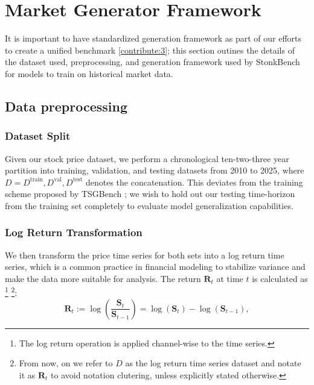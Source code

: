 \section{Market Generator Framework}\label{sec:generator-framework}
It is important to have standardized generation framework as
part of our efforts to create a unified benchmark \ref{contribute:3};
this section outines the details of the dataset used, preprocessing, and
 generation framework used by StonkBench for models to train on 
 historical market data.

\subsection{Data preprocessing}\label{subsec:data-preprocess}
    \subsubsection{Dataset Split}
    Given our stock price dataset, we perform a chronological
    ten-two-three year partition into training, validation, and testing
    datasets from 2010 to 2025, where $D = D^{\mathrm{train}}, D^{\mathrm{val}}, D^{\mathrm{test}}$ denotes the concatenation.
    This deviates from the training scheme proposed by TSGBench \cite{Ang23}; we wish to 
    hold out our testing time-horizon from the training set completely
    to evaluate model generalization capabilities.
    
    \subsubsection{Log Return Transformation}
    We then transform the price time series for both sets into a log return time series, 
    which is a common practice in financial modeling to stabilize variance 
    and make the data more suitable for analysis. The return \( \mathbf{R}_t \) at time \( t \) is calculated as
    \footnote{The log return operation is applied channel-wise to the time series.}
    \footnote{From now, on we refer to $D$ as the log return time series dataset and notate it as $\mathbf{R}_t$
    to avoid notation clutering, unless explicitly stated otherwise.}:
    \begin{equation}
    \mathbf{R}_t := \log\left(\frac{\mathbf{S}_t}{\mathbf{S}_{t-1}}\right) = \log(\mathbf{S}_t) - \log(\mathbf{S}_{t-1}),
    \end{equation}

